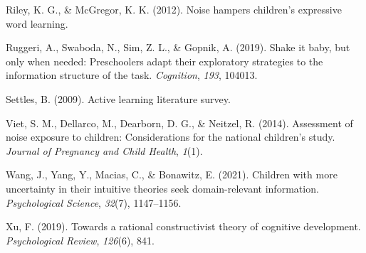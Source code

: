 \documentclass[10pt, letterpaper]{article}
\begin{document}
\leavevmode\hypertarget{ref-riley2012}{}%
Riley, K. G., \& McGregor, K. K. (2012). Noise hampers children's
expressive word learning.

\leavevmode\hypertarget{ref-ruggeri2019}{}%
Ruggeri, A., Swaboda, N., Sim, Z. L., \& Gopnik, A. (2019). Shake it
baby, but only when needed: Preschoolers adapt their exploratory
strategies to the information structure of the task. \emph{Cognition},
\emph{193}, 104013.

\leavevmode\hypertarget{ref-settles2009}{}%
Settles, B. (2009). Active learning literature survey.

\leavevmode\hypertarget{ref-viet2014}{}%
Viet, S. M., Dellarco, M., Dearborn, D. G., \& Neitzel, R. (2014).
Assessment of noise exposure to children: Considerations for the
national children's study. \emph{Journal of Pregnancy and Child Health},
\emph{1}(1).

\leavevmode\hypertarget{ref-wang2021}{}%
Wang, J., Yang, Y., Macias, C., \& Bonawitz, E. (2021). Children with
more uncertainty in their intuitive theories seek domain-relevant
information. \emph{Psychological Science}, \emph{32}(7), 1147--1156.

\leavevmode\hypertarget{ref-xu2019}{}%
Xu, F. (2019). Towards a rational constructivist theory of cognitive
development. \emph{Psychological Review}, \emph{126}(6), 841.


\end{document}
